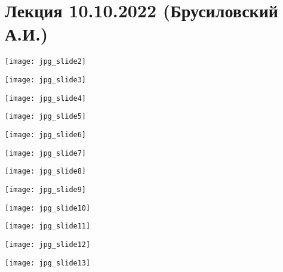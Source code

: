 \documentclass[main.tex]{subfiles}
\begin{document}
\section{Лекция 10.10.2022 (Брусиловский А.И.)}

\begin{center}
\texttt{[image: jpg\_slide2]}
\end{center}

\begin{center}
\texttt{[image: jpg\_slide3]}
\end{center}

\begin{center}
\texttt{[image: jpg\_slide4]}
\end{center}

\begin{center}
\texttt{[image: jpg\_slide5]}
\end{center}

\begin{center}
\texttt{[image: jpg\_slide6]}
\end{center}

\begin{center}
\texttt{[image: jpg\_slide7]}
\end{center}

\begin{center}
\texttt{[image: jpg\_slide8]}
\end{center}

\begin{center}
\texttt{[image: jpg\_slide9]}
\end{center}

\begin{center}
\texttt{[image: jpg\_slide10]}
\end{center}

\begin{center}
\texttt{[image: jpg\_slide11]}
\end{center}

\begin{center}
\texttt{[image: jpg\_slide12]}
\end{center}

\begin{center}
\texttt{[image: jpg\_slide13]}
\end{center}
\end{document}
